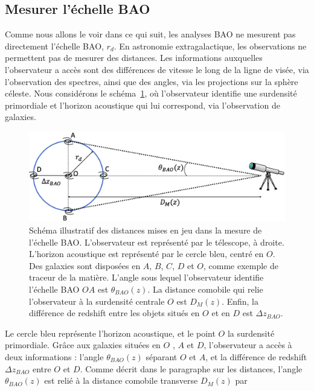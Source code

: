\documentclass[11pt, twoside, a4paper, openright]{report}
\begin{document}
\subsection{Mesurer l'échelle BAO}
\label{subsec:mesure_bao}
Comme nous allons le voir dans ce qui suit, les analyses BAO ne mesurent pas directement l'échelle BAO, $r_{d}$. En astronomie extragalactique, les observations  ne permettent pas de mesurer des distances. Les informations auxquelles l'observateur a accès sont des différences de vitesse le long de la ligne de visée, via l'observation des spectres, ainsi que des angles, via les projections sur la sphère céleste.
Nous considérons le schéma~\ref{fig:bao_dessin}, où l'observateur identifie une surdensité primordiale et l'horizon acoustique qui lui correspond, via l'observation de galaxies.
\begin{figure}
  \centering
  \includegraphics[scale=0.40]{bao_dessin}
  \caption{Schéma illustratif des distances mises en jeu dans la mesure de l'échelle BAO. L'observateur est représenté par le télescope, à droite. L'horizon acoustique est représenté par le cercle bleu, centré en $O$. Des galaxies sont disposées en $A$, $B$, $C$, $D$ et $O$, comme exemple de traceur de la matière. L'angle sous lequel l'observateur identifie l'échelle BAO $OA$ est $\theta_{BAO}(z)$. La distance comobile qui relie l'observateur à la surdensité centrale $O$ est $D_M(z)$. Enfin, la différence de redshift entre les objets situés en $O$ et en $D$ est $\Delta z_{BAO}$.}
  \label{fig:bao_dessin}
\end{figure}
Le cercle bleu représente l'horizon acoustique, et le point $O$ la surdensité primordiale. Grâce aux galaxies situées en $O$ , $A$  et $D$, l'observateur a accès à deux informations : l'angle $\theta_{BAO}(z)$ séparant $O$ et $A$, et la différence de redshift $\Delta z_{BAO}$ entre $O$ et $D$. Comme décrit dans le paragraphe sur les distances, l'angle $\theta_{BAO}(z)$ est relié à la distance comobile transverse $D_M(z)$ par
\end{document}
